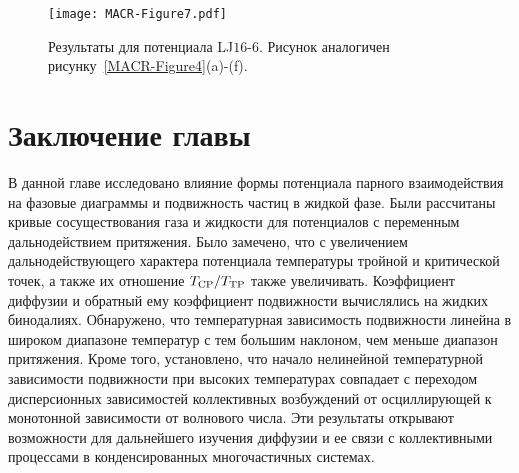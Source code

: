 \begin{figure}
\centering
 \texttt{[image: MACR-Figure7.pdf]}
 \caption{Результаты для потенциала LJ$16$-$6$. Рисунок аналогичен рисунку~\ref{MACR-Figure4}(a)-(f).}
\label{MACR-Figure7}
\end{figure}


\section{Заключение главы}
\label{MACR-SecConclusions}

В данной главе исследовано влияние формы потенциала парного взаимодействия на фазовые диаграммы и подвижность частиц в жидкой фазе. Были рассчитаны кривые сосуществования газа и жидкости для потенциалов с переменным дальнодействием притяжения. Было замечено, что с увеличением дальнодействующего характера потенциала температуры тройной и критической точек, а также их отношение $T_{\rm CP}/T_{\rm TP}$ также увеличивать. Коэффициент диффузии и обратный ему коэффициент подвижности вычислялись на жидких бинодалиях. Обнаружено, что температурная зависимость подвижности линейна в широком диапазоне температур с тем большим наклоном, чем меньше диапазон притяжения. Кроме того, установлено, что начало нелинейной температурной зависимости подвижности при высоких температурах совпадает с переходом дисперсионных зависимостей коллективных возбуждений от осциллирующей к монотонной зависимости от волнового числа. Эти результаты открывают возможности для дальнейшего изучения диффузии и ее связи с коллективными процессами в конденсированных многочастичных системах.
